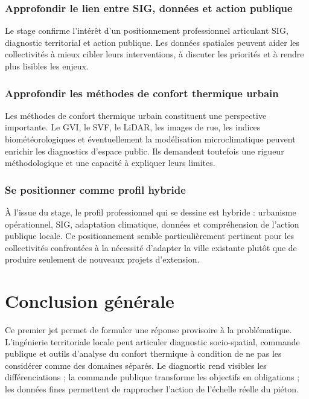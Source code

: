 \documentclass[11pt,a4paper]{report}
\begin{document}
\subsection{Approfondir le lien entre SIG, données et action publique}

Le stage confirme l'intérêt d'un positionnement professionnel articulant SIG, diagnostic territorial et action publique. Les données spatiales peuvent aider les collectivités à mieux cibler leurs interventions, à discuter les priorités et à rendre plus lisibles les enjeux.

\subsection{Approfondir les méthodes de confort thermique urbain}

Les méthodes de confort thermique urbain constituent une perspective importante. Le GVI, le SVF, le LiDAR, les images de rue, les indices biométéorologiques et éventuellement la modélisation microclimatique peuvent enrichir les diagnostics d'espace public. Ils demandent toutefois une rigueur méthodologique et une capacité à expliquer leurs limites.

\subsection{Se positionner comme profil hybride}

À l'issue du stage, le profil professionnel qui se dessine est hybride : urbanisme opérationnel, SIG, adaptation climatique, données et compréhension de l'action publique locale. Ce positionnement semble particulièrement pertinent pour les collectivités confrontées à la nécessité d'adapter la ville existante plutôt que de produire seulement de nouveaux projets d'extension.

\chapter*{Conclusion générale}

Ce premier jet permet de formuler une réponse provisoire à la problématique. L'ingénierie territoriale locale peut articuler diagnostic socio-spatial, commande publique et outils d'analyse du confort thermique à condition de ne pas les considérer comme des domaines séparés. Le diagnostic rend visibles les différenciations ; la commande publique transforme les objectifs en obligations ; les données fines permettent de rapprocher l'action de l'échelle réelle du piéton.
\end{document}
